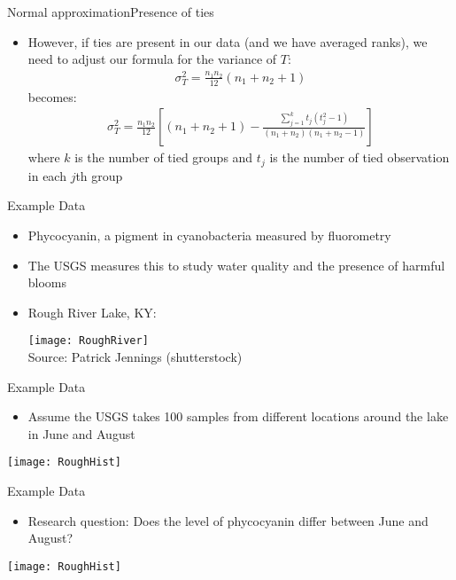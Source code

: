 \documentclass[xcolor=dvipsnames]{beamer}
\begin{document}
\begin{frame}{Normal approximation}{Presence of ties}
\begin{itemize}
	\item However, if ties are present in our data (and we have averaged ranks), we need to adjust our formula for the variance of $T$:
	\begin{gather*}
	\sigma_T^{2} = \frac{n_1 n_2}{12}(n_1 +n_2 +1)
	\end{gather*}
	becomes:
	\begin{gather*}
	\sigma_T^{2} = \frac{n_1 n_2}{12}\left[(n_1 +n_2 +1)- \frac{\sum_{j=1}^k t_j (t_j^2-1)}{(n_1+n_2)(n_1+n_2-1)}\right]
	\end{gather*}
	where $k$ is the number of tied groups and $t_j$ is the number of tied observation in each $j$th group
\end{itemize}
\end{frame}

\begin{frame}{Example Data}
	\begin{itemize}
		\item Phycocyanin, a pigment in cyanobacteria measured by fluorometry
		\item The USGS measures this to study water quality and the presence of harmful blooms 
		\item Rough River Lake, KY:
		\begin{center}
			\texttt{[image: RoughRiver]} \\
			{\tiny Source: Patrick Jennings (shutterstock)}
		\end{center}
	\end{itemize}
\end{frame}

\begin{frame}{Example Data}
\begin{itemize}
	\item Assume the USGS takes 100 samples from different locations around the lake in June and August
\end{itemize}
	\begin{center}
		\texttt{[image: RoughHist]}
	\end{center}
\end{frame}

\begin{frame}{Example Data}
\begin{itemize}
	\item Research question: Does the level of phycocyanin differ between June and August?
\end{itemize}
\begin{center}
	\texttt{[image: RoughHist]}
\end{center}
\end{frame}
\end{document}

